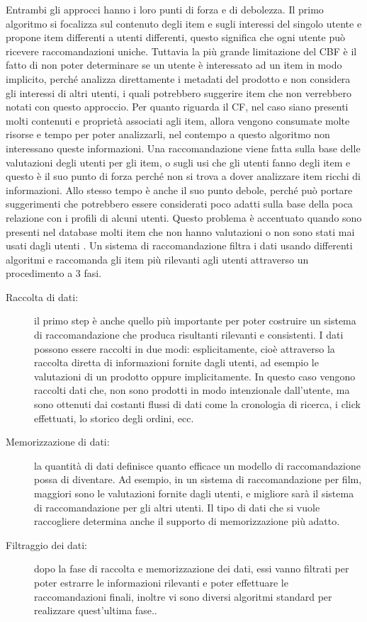 Entrambi gli approcci hanno i loro punti di forza e di debolezza. Il primo algoritmo si focalizza sul contenuto degli item e
sugli interessi del singolo utente e propone item differenti a utenti differenti, questo significa che ogni utente può ricevere 
raccomandazioni uniche. 
Tuttavia la più grande limitazione del CBF è il fatto di non poter determinare se un utente è interessato ad un item in modo implicito,
perché analizza direttamente i metadati del prodotto e non considera gli interessi di altri utenti, i quali potrebbero 
suggerire item che non verrebbero notati con questo approccio.
Per quanto riguarda il CF, nel caso siano presenti molti contenuti e proprietà associati agli item, allora vengono consumate molte 
risorse e tempo per poter analizzarli, nel contempo a questo algoritmo non interessano queste informazioni. Una raccomandazione 
viene fatta sulla base delle valutazioni degli utenti per gli item, o sugli usi che gli utenti fanno degli item e questo è il suo punto 
di forza perché non si trova a dover analizzare item ricchi di informazioni. Allo stesso tempo è anche il suo punto debole, perché può
portare suggerimenti che potrebbero essere considerati poco adatti sulla base della poca relazione con i profili di alcuni utenti. 
Questo problema è accentuato quando sono presenti nel database molti item che non hanno valutazioni o non sono stati mai usati dagli 
utenti \cite{model-based-approach-for-collaborative-filtering}.
\vspace{0.5 cm}
\hfill\break
Un sistema di raccomandazione filtra i dati usando differenti algoritmi e raccomanda gli item più rilevanti agli utenti attraverso 
un procedimento a 3 fasi.
\begin{description}
    \item[Raccolta di dati:] il primo step è anche quello più importante per poter costruire un sistema di 
    raccomandazione che produca risultanti rilevanti e consistenti. I dati possono essere raccolti in due modi: esplicitamente, 
    cioè attraverso la raccolta diretta di informazioni fornite dagli utenti, ad esempio le valutazioni di un prodotto oppure 
    implicitamente. In questo caso vengono raccolti dati che, non sono prodotti in modo intenzionale dall'utente, ma sono ottenuti 
    dai costanti flussi di dati come la cronologia di ricerca, i click effettuati, lo storico degli ordini, ecc.
    \item[Memorizzazione di dati:] la quantità di dati definisce quanto efficace un modello di raccomandazione possa di 
    diventare. Ad esempio, in un sistema di raccomandazione per film, maggiori sono le valutazioni fornite dagli utenti, e 
    migliore sarà il sistema di raccomandazione per gli altri utenti. Il tipo di dati che si vuole raccogliere determina
    anche il supporto di memorizzazione più adatto.
    \item[Filtraggio dei dati:] dopo la fase di raccolta e memorizzazione dei dati, essi vanno filtrati per poter estrarre 
    le informazioni rilevanti e poter effettuare le raccomandazioni finali, inoltre vi sono diversi algoritmi standard per 
    realizzare quest'ultima fase..
\end{description}
